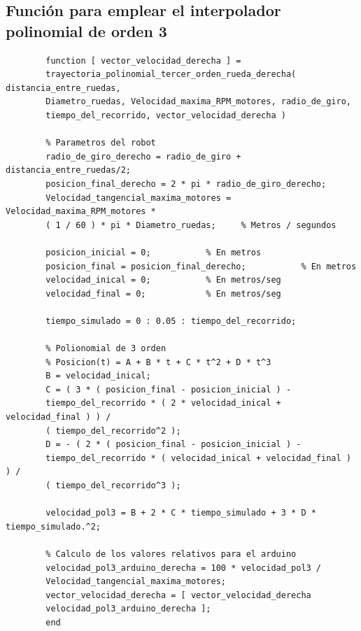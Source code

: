\documentclass[12pt,a4paper]{article}
\begin{document}
        
        \subsection{Función para emplear el interpolador polinomial de orden 3}
        
        \begin{verbatim}
        function [ vector_velocidad_derecha ] =
        trayectoria_polinomial_tercer_orden_rueda_derecha( distancia_entre_ruedas,
        Diametro_ruedas, Velocidad_maxima_RPM_motores, radio_de_giro,
        tiempo_del_recorrido, vector_velocidad_derecha )

        % Parametros del robot
        radio_de_giro_derecho = radio_de_giro + distancia_entre_ruedas/2;
        posicion_final_derecho = 2 * pi * radio_de_giro_derecho;
        Velocidad_tangencial_maxima_motores = Velocidad_maxima_RPM_motores *
        ( 1 / 60 ) * pi * Diametro_ruedas;     % Metros / segundos

        posicion_inicial = 0;           % En metros
        posicion_final = posicion_final_derecho;           % En metros
        velocidad_inical = 0;           % En metros/seg
        velocidad_final = 0;            % En metros/seg

        tiempo_simulado = 0 : 0.05 : tiempo_del_recorrido;

        % Polionomial de 3 orden
        % Posicion(t) = A + B * t + C * t^2 + D * t^3
        B = velocidad_inical;
        C = ( 3 * ( posicion_final - posicion_inicial ) -
        tiempo_del_recorrido * ( 2 * velocidad_inical + velocidad_final ) ) /
        ( tiempo_del_recorrido^2 );
        D = - ( 2 * ( posicion_final - posicion_inicial ) -
        tiempo_del_recorrido * ( velocidad_inical + velocidad_final ) ) /
        ( tiempo_del_recorrido^3 );

        velocidad_pol3 = B + 2 * C * tiempo_simulado + 3 * D * tiempo_simulado.^2;

        % Calculo de los valores relativos para el arduino
        velocidad_pol3_arduino_derecha = 100 * velocidad_pol3 /
        Velocidad_tangencial_maxima_motores;
        vector_velocidad_derecha = [ vector_velocidad_derecha
        velocidad_pol3_arduino_derecha ];
        end
		\end{verbatim}
        
        
\end{document}
